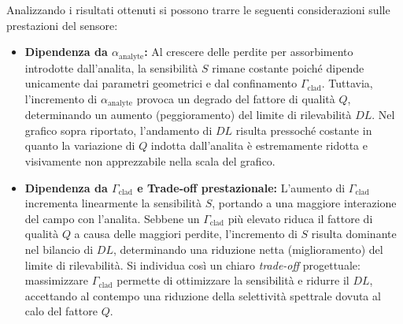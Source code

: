 \noindent Analizzando i risultati ottenuti si possono trarre le seguenti considerazioni sulle prestazioni del sensore:
\begin{itemize}
    \item \textbf{Dipendenza da $\alpha_{\text{analyte}}$:} Al crescere delle perdite per assorbimento introdotte dall'analita, la sensibilità $S$ rimane costante poiché
    dipende unicamente dai parametri geometrici e dal confinamento $\Gamma_{\text{clad}}$. Tuttavia, l'incremento di $\alpha_{\text{analyte}}$ provoca un degrado del
    fattore di qualità $Q$, determinando un aumento (peggioramento) del limite di rilevabilità $DL$. Nel grafico sopra riportato, l'andamento di $DL$ risulta pressoché costante
    in quanto la variazione di $Q$ indotta dall'analita è estremamente ridotta e visivamente non apprezzabile nella scala del grafico.
    
    \item \textbf{Dipendenza da $\Gamma_{\text{clad}}$ e Trade-off prestazionale:} L'aumento di $\Gamma_{\text{clad}}$ incrementa linearmente la sensibilità $S$, portando a
    una maggiore interazione del campo con l'analita. Sebbene un $\Gamma_{\text{clad}}$ più elevato riduca il fattore di qualità $Q$ a causa delle maggiori perdite,
    l'incremento di $S$ risulta dominante nel bilancio di $DL$, determinando una riduzione netta (miglioramento) del limite di rilevabilità. Si individua così un chiaro
    \textit{trade-off} progettuale: massimizzare $\Gamma_{\text{clad}}$ permette di ottimizzare la sensibilità e ridurre il $DL$, accettando al contempo una riduzione della
    selettività spettrale dovuta al calo del fattore $Q$.
\end{itemize}
